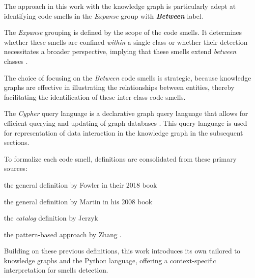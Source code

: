 The approach in this work with the knowledge graph is particularly adept at identifying code smells in the \textit{Expanse} group with \textit{\textbf{Between}} label. 

The \textit{Expanse} grouping is defined by the scope of the code smells. It determines whether these smells are confined \textit{within} a single class or whether their detection necessitates a broader perspective, implying that these smells extend \textit{between} classes \cite{Jerzyk_2023}.

The choice of focusing on the \textit{Between} code smells is strategic, because knowledge graphs are effective in illustrating the relationships between entities, thereby facilitating the identification of these inter-class code smells.


The \textit{Cypher} query language is a declarative graph query language that allows for efficient querying and updating of graph databases \cite{neo4j_cypher_overview}. This query language is used for representation of data interaction in the knowledge graph in the subsequent sections.


To formalize each code smell, definitions are consolidated from these primary sources: 
\begin{enumerate*}[label={\alph*)},font={\color{cyan!50!black}\bfseries}]
\item the general definition by Fowler \etal in their 2018 book \cite{Martin_2018}
\item the general definition by Martin in his 2008 book \cite{Martin_2008}
\item the \textit{catalog} definition by Jerzyk \etal \cite{Jerzyk_2023}
\item the pattern-based approach by Zhang \etal \cite{Zhang_2008}.
\end{enumerate*}
Building on these previous definitions, this work introduces its own tailored to knowledge graphs and the Python language, offering a context-specific interpretation for smells detection.









